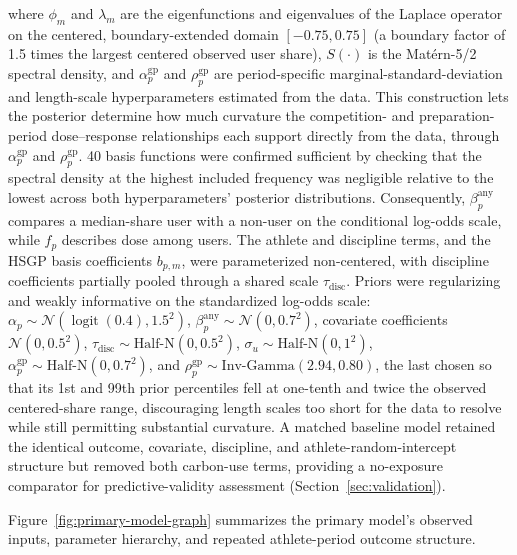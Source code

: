 where $\phi_m$ and $\lambda_m$ are the eigenfunctions and eigenvalues of the Laplace operator on the centered, boundary-extended domain $[-0.75, 0.75]$ (a boundary factor of 1.5 times the largest centered observed user share), $S(\cdot)$ is the Mat\'ern-5/2 spectral density, and $\alpha^{\text{gp}}_p$ and $\rho^{\text{gp}}_p$ are period-specific marginal-standard-deviation and length-scale hyperparameters estimated from the data. This construction lets the posterior determine how much curvature the competition- and preparation-period dose--response relationships each support directly from the data, through $\alpha^{\text{gp}}_p$ and $\rho^{\text{gp}}_p$. 40 basis functions were confirmed sufficient by checking that the spectral density at the highest included frequency was negligible relative to the lowest across both hyperparameters' posterior distributions. Consequently, $\beta^{\text{any}}_p$ compares a median-share user with a non-user on the conditional log-odds scale, while $f_p$ describes dose among users. The athlete and discipline terms, and the HSGP basis coefficients $b_{p,m}$, were parameterized non-centered, with discipline coefficients partially pooled through a shared scale $\tau_{\text{disc}}$. Priors were regularizing and weakly informative on the standardized log-odds scale: $\alpha_p\sim\mathcal{N}(\operatorname{logit}(0.4),1.5^2)$, $\beta^{\text{any}}_p\sim\mathcal N(0,0.7^2)$, covariate coefficients $\mathcal{N}(0, 0.5^2)$, $\tau_{\text{disc}} \sim \text{Half-N}(0, 0.5^2)$, $\sigma_u \sim \text{Half-N}(0, 1^2)$, $\alpha^{\text{gp}}_p \sim \text{Half-N}(0, 0.7^2)$, and $\rho^{\text{gp}}_p \sim \text{Inv-Gamma}(2.94, 0.80)$, the last chosen so that its 1st and 99th prior percentiles fell at one-tenth and twice the observed centered-share range, discouraging length scales too short for the data to resolve while still permitting substantial curvature. A matched baseline model retained the identical outcome, covariate, discipline, and athlete-random-intercept structure but removed both carbon-use terms, providing a no-exposure comparator for predictive-validity assessment (Section~\ref{sec:validation}).

Figure~\ref{fig:primary-model-graph} summarizes the primary model's observed inputs, parameter hierarchy, and repeated athlete-period outcome structure.


